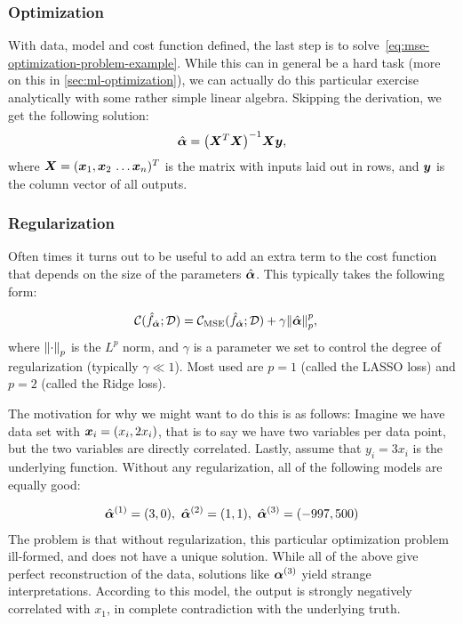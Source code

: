\documentclass[Thesis.tex]{subfiles}
\begin{document}
\subsubsection{Optimization}

With data, model and cost function defined, the last step is to
solve~\cref{eq:mse-optimization-problem-example}. While this can in general be a
hard task (more on this in \cref{sec:ml-optimization}), we can
actually do this particular exercise analytically with some rather simple linear algebra. Skipping
the derivation, we get the following solution:
\begin{align}
  \hat{\bm{\alpha}} = \qty(\bm{X}^T\bm{X})^{-1}\bm{X}\bm{y},
\end{align}
where $\vX = (\vx_1, \vx_2\,\dots\vx_n)^T$ is the matrix with inputs laid out in
rows, and $\bm{y}$ is the column vector of all outputs.

\subsubsection{Regularization}

Often times it turns out to be useful to add an extra term to the cost function
that depends on the size of the parameters $\hat{\bm{\alpha}}$. This typically takes
the following form:

\begin{align}
  \mathcal{C}(\hat f_{\hat{\bm{\alpha}}};\mathcal{D}) &=   \mathcal{C}_\text{MSE}(\hat f_{\hat{\bm{\alpha}}};\mathcal{D}) + \gamma\norm{\hat{\bm{\alpha}}}_p^p,
\end{align}
where $\norm{\cdot}_p$ is the $L^p$ norm, and $\gamma$ is a parameter
we set to control the degree of regularization (typically $\gamma\ll 1$). Most
used are $p=1$ (called the LASSO loss) and $p=2$ (called the Ridge loss).

The motivation for why we might want to do this is as follows: Imagine we have
data set with $\bm{x}_i = (x_i, 2x_i)$, that is to say we have two variables per
data point, but the two variables are directly correlated. Lastly, assume that
$y_i = 3x_i$ is the underlying function. Without any regularization, all of the
following models are equally good:

\begin{align}
  \hat\valpha^{(1)} = (3, 0),\ \hat\valpha^{(2)} = (1, 1),\ \hat\valpha^{(3)} = (-997, 500)
\end{align}
The problem is that without regularization, this particular
optimization problem ill-formed, and does not have a unique solution. While all
of the above give perfect reconstruction of the data, solutions like
$\bm{\alpha}^{(3)}$ yield strange interpretations. According to this model, the
output is strongly negatively correlated with $x_1$, in complete contradiction
with the underlying truth.
\end{document}
